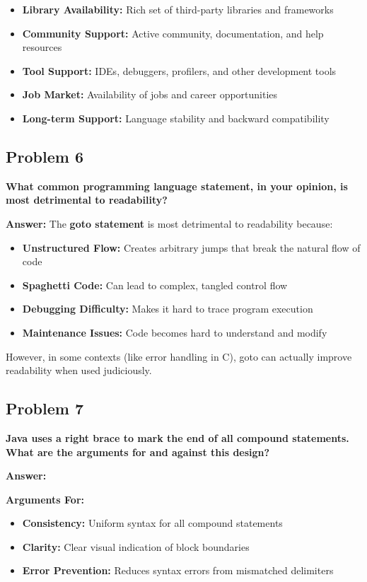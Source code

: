 \documentclass[11pt,a4paper]{article}
\begin{document}
\begin{itemize}
\item \textbf{Library Availability:} Rich set of third-party libraries and frameworks
\item \textbf{Community Support:} Active community, documentation, and help resources
\item \textbf{Tool Support:} IDEs, debuggers, profilers, and other development tools
\item \textbf{Job Market:} Availability of jobs and career opportunities
\item \textbf{Long-term Support:} Language stability and backward compatibility
\end{itemize}

\subsection{Problem 6}
\textbf{What common programming language statement, in your opinion, is most detrimental to readability?}

\textbf{Answer:}
The \textbf{goto statement} is most detrimental to readability because:

\begin{itemize}
\item \textbf{Unstructured Flow:} Creates arbitrary jumps that break the natural flow of code
\item \textbf{Spaghetti Code:} Can lead to complex, tangled control flow
\item \textbf{Debugging Difficulty:} Makes it hard to trace program execution
\item \textbf{Maintenance Issues:} Code becomes hard to understand and modify
\end{itemize}

However, in some contexts (like error handling in C), goto can actually improve readability when used judiciously.

\subsection{Problem 7}
\textbf{Java uses a right brace to mark the end of all compound statements. What are the arguments for and against this design?}

\textbf{Answer:}

\textbf{Arguments For:}
\begin{itemize}
\item \textbf{Consistency:} Uniform syntax for all compound statements
\item \textbf{Clarity:} Clear visual indication of block boundaries
\item \textbf{Error Prevention:} Reduces syntax errors from mismatched delimiters
\end{itemize}
\end{document}
